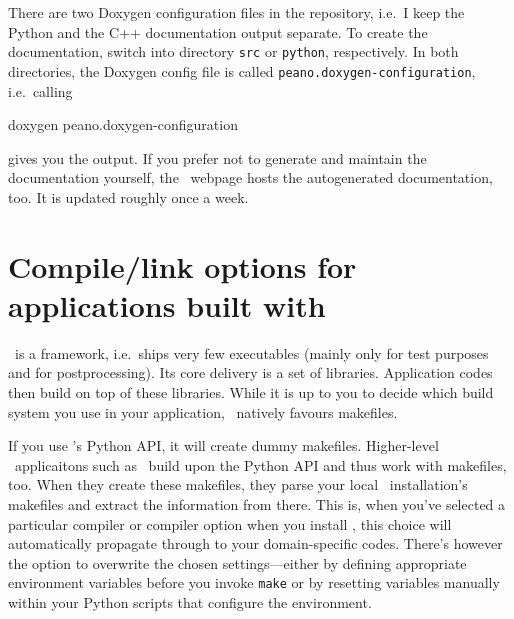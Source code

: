 There are two Doxygen configuration files in the repository, i.e.~I keep the
Python and the C++ documentation output separate.
To create the documentation, switch into directory \texttt{src} or
\texttt{python}, respectively. 
In both directories, the Doxygen config file is called
\texttt{peano.doxygen-configuration}, i.e.~calling

\begin{code}
doxygen peano.doxygen-configuration
\end{code}

\noindent
gives you the output. If you prefer not to generate and maintain the
documentation yourself, the \Peano\ webpage hosts the autogenerated
documentation, too.
It is updated roughly once a week.



\section{Compile/link options for applications built with \Peano}
\label{section:installation:applications-built-with-Peano}

\Peano\ is a framework, i.e.~ships very few executables (mainly only for test
purposes and for postprocessing).
Its core delivery is a set of libraries.
Application codes then build on top of these libraries.
While it is up to you to decide which build system you use in your application,
\Peano\ natively favours makefiles.


If you use \Peano's Python API, it will create dummy makefiles.
Higher-level \Peano\ applicaitons such as \ExaHyPE\ build upon the Python API
and thus work with makefiles, too.
When they create these makefiles, they parse your local \Peano\ installation's
makefiles and extract the information from there.
This is, when you've selected a particular compiler or compiler option when you
install \Peano, this choice will automatically propagate through to your
domain-specific codes.
There's however the option to overwrite the chosen settings---either by defining
appropriate environment variables before you invoke \texttt{make} or by
resetting variables manually within your Python scripts that configure the
environment.



